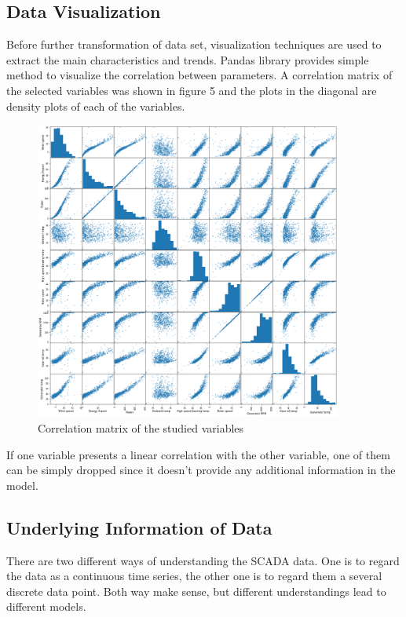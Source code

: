 \subsection{Data Visualization}
Before further transformation of data set, visualization techniques are used to extract the main characteristics and trends. Pandas library provides simple method to visualize the correlation between parameters. A correlation matrix of the selected variables was shown in figure 5 and the plots in the diagonal are density plots of each of the variables.

\begin{figure}[]
\centering
\includegraphics[width=0.9\textwidth]{figures/correlation_matrix.png}
\caption{Correlation matrix of the studied variables}
\label{fig:B-B1}
\end{figure}

If one variable presents a linear correlation with the other variable, one of them can be simply dropped since it doesn't provide any additional information in the model.

\subsection{Underlying Information of Data}
There are two different ways of understanding the SCADA data. One is to regard the data as a continuous time series, the other one is to regard them a several discrete data point. Both way make sense, but different understandings lead to different models.

